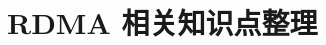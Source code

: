 \chapter{RDMA 相关知识点整理}\label{chap:rdma}

\begin{intro}

\end{intro}

\section{}

\subsection{}

\subsection{}


\endinput